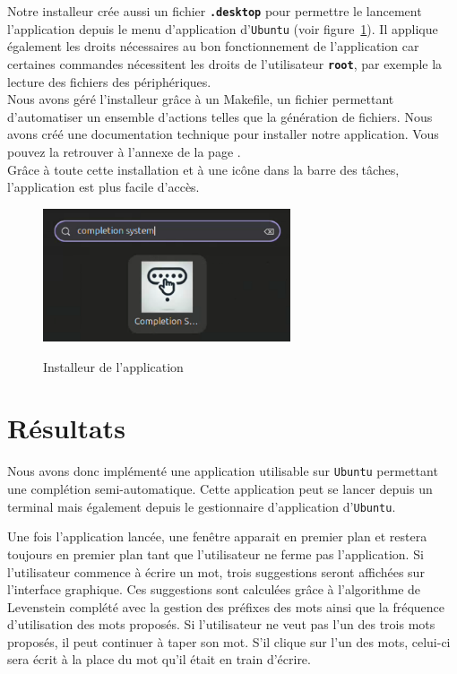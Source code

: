 \documentclass[a4paper, 11pt]{report}
\newcommand{\var}[1]{\texttt{\textbf{#1}}}
\newcommand{\langage}[1]{\texttt{#1}}
\begin{document}
{Notre installeur crée aussi un fichier \var{.desktop} pour permettre le lancement l'application depuis le menu d'application d'\langage{Ubuntu} (voir figure~\ref{fig:lanceur}). Il applique également les droits nécessaires au bon fonctionnement de l'application car certaines commandes nécessitent les droits de l'utilisateur \var{root}, par exemple la lecture des fichiers des périphériques. \\

Nous avons géré l'installeur grâce à un Makefile, un fichier permettant d'automatiser un ensemble d'actions telles que la génération de fichiers. Nous avons créé une documentation technique pour installer notre application. Vous pouvez la retrouver à l'annexe de la page \underline{\pageref{annexe}}.\\

Grâce à toute cette installation et à une icône dans la barre des tâches, l'application est plus facile d'accès.

\begin{figure}[H]
	\begin{center}
		{\includegraphics[width=0.65\textwidth]{images/application.png}}
	\end{center}
	\caption{Installeur de l'application}
	\label{fig:lanceur}
\end{figure}

\section{Résultats}
Nous avons donc implémenté une application utilisable sur \langage{Ubuntu} permettant une complétion semi-automatique. Cette application peut se lancer depuis un terminal mais également depuis le gestionnaire d'application d'\langage{Ubuntu}. \par
Une fois l'application lancée, une fenêtre apparait en premier plan et restera toujours en premier plan tant que l'utilisateur ne ferme pas l'application. Si l'utilisateur commence à écrire un mot, trois suggestions seront affichées sur l'interface graphique. Ces suggestions sont calculées grâce à l'algorithme de Levenstein complété avec la gestion des préfixes des mots ainsi que la fréquence d'utilisation des mots proposés. Si l'utilisateur ne veut pas l'un des trois mots proposés, il peut continuer à taper son mot. S'il clique sur l'un des mots, celui-ci sera écrit à la place du mot qu'il était en train d'écrire.


}
\end{document}
